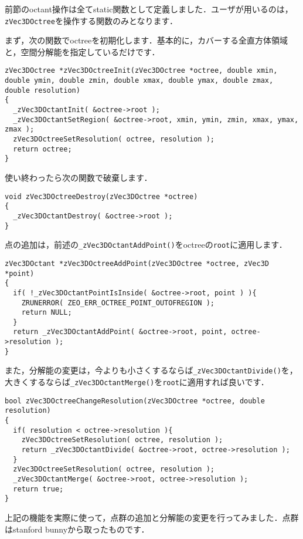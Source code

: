 ﻿\documentclass[a4paper]{jsarticle}
\begin{document}
前節のoctant操作は全てstatic関数として定義しました．ユーザが用いるのは，\verb|zVec3DOctree|を操作する関数のみとなります．

まず，次の関数でoctreeを初期化します．基本的に，カバーする全直方体領域と，空間分解能を指定しているだけです．
\begin{screen}
\begin{verbatim}
zVec3DOctree *zVec3DOctreeInit(zVec3DOctree *octree, double xmin, double ymin, double zmin, double xmax, double ymax, double zmax, double resolution)
{
  _zVec3DOctantInit( &octree->root );
  _zVec3DOctantSetRegion( &octree->root, xmin, ymin, zmin, xmax, ymax, zmax );
  zVec3DOctreeSetResolution( octree, resolution );
  return octree;
}
\end{verbatim}
\end{screen}

使い終わったら次の関数で破棄します．
\begin{screen}
\begin{verbatim}
void zVec3DOctreeDestroy(zVec3DOctree *octree)
{
  _zVec3DOctantDestroy( &octree->root );
}
\end{verbatim}
\end{screen}

点の追加は，前述の\verb|_zVec3DOctantAddPoint()|をoctreeの\verb|root|に適用します．
\begin{screen}
\begin{verbatim}
zVec3DOctant *zVec3DOctreeAddPoint(zVec3DOctree *octree, zVec3D *point)
{
  if( !_zVec3DOctantPointIsInside( &octree->root, point ) ){
    ZRUNERROR( ZEO_ERR_OCTREE_POINT_OUTOFREGION );
    return NULL;
  }
  return _zVec3DOctantAddPoint( &octree->root, point, octree->resolution );
}
\end{verbatim}
\end{screen}


また，分解能の変更は，今よりも小さくするならば\verb|_zVec3DOctantDivide()|を，大きくするならば\verb|_zVec3DOctantMerge()|を\verb|root|に適用すれば良いです．
\begin{screen}
\begin{verbatim}
bool zVec3DOctreeChangeResolution(zVec3DOctree *octree, double resolution)
{
  if( resolution < octree->resolution ){
    zVec3DOctreeSetResolution( octree, resolution );
    return _zVec3DOctantDivide( &octree->root, octree->resolution );
  }
  zVec3DOctreeSetResolution( octree, resolution );
  _zVec3DOctantMerge( &octree->root, octree->resolution );
  return true;
}
\end{verbatim}
\end{screen}

上記の機能を実際に使って，点群の追加と分解能の変更を行ってみました．点群はstanford bunnyから取ったものです．
\end{document}
